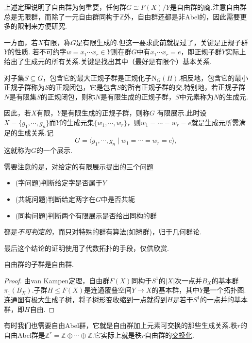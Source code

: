 上述定理说明了自由群为何重要，任何群$G\cong F(X)/Y$是自由群的商.注意自由群总是无限群，而除了一元自由群同构于$\mathbb{Z}$外，自由群还都是非Abel的，因此需要更多的限制来方便研究.

一方面，若$X$有限，称$G$是{\heiti 有限生成的}.但这一要求此前就提过了，关键是正规子群$Y$的性质.
若不可约字$w=x_1\cdots x_r\in Y$则在群$G$中有$x_1\cdots x_r=e$，即正规子群$Y$实际上给出了生成元的所有关系.关键是找出其中（最好是有限个）基本关系.

对子集$S\subseteq G$，包含它的最大正规子群是正规化子$\mathrm{N}_G(H)$.相反地，包含它的最小正规子群称为$S$的{\heiti 正规闭包}，它是包含$S$的所有正规子群的交.特别地，若正规子群$N$是有限集$S$的正规闭包，则称$N$是{\heiti 有限生成的正规子群}，$S$中元素称为$N$的生成元.

因此，若$X$有限，$Y$是有限生成的正规子群，则称$G$ {\heiti 有限展示}.此时设$X=\{g_1,\cdots,g_n\}$而$Y$的生成元集$\{w_1,\cdots,w_r\}$，则$w_1=\cdots=w_r=e$就是生成元所需满足的{\heiti 生成关系}.记
\[
	G=\langle g_1,\cdots,g_n\mid w_1=\cdots=w_r=e\rangle ,
\]
这就称为$G$的一个{\heiti 展示}.
\begin{remark}
	需要注意的是，对给定的有限展示提出的三个问题
	\begin{itemize}
		\item (字问题)判断给定字是否属于$Y$
		\item (共轭问题)判断给定两字在$G$中是否共轭
		\item (同构问题)判断两个有限展示是否给出同构的群
	\end{itemize}
	都是\emph{不可判定的}，而只对特殊的群有算法(如辫群)，归于几何群论.
\end{remark}

最后这个结论的证明使用了代数拓扑的手段，仅供欣赏.
\begin{thm}
	自由群的子群是自由群.
\end{thm}
\begin{proof}
	由van Kampen定理，自由群$F(X)$同构于$S^1$的$|X|$次一点并$B_X$的基本群$\pi_1(B_X)$.子群$H\le F(X)$是连通覆叠空间$Y\to X$的基本群，其中$Y$是一个拓扑图.连通图有极大生成子树，将子树形变收缩到一点就得到$H$是若干$S^1$的一点并的基本群，即$H$自由.
\end{proof}

\begin{remark}
	有时我们也需要{\heiti 自由Abel群}，它就是自由群加上元素可交换的那些生成关系.秩$r$的自由Abel群是$\mathbb{Z}^{r}=\mathbb{Z}\oplus\cdots\oplus\mathbb{Z}$.它实际上就是秩$r$自由群的\hyperlink{text:Abelianization}{交换化}.
\end{remark}
